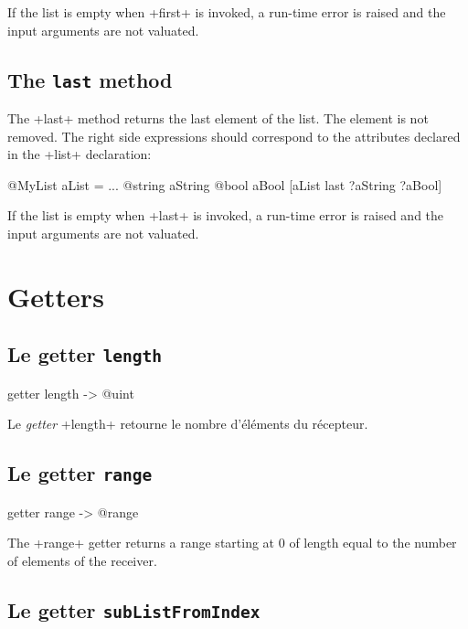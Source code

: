 If the list is empty when \ggs+first+ is invoked, a run-time error is raised and the input arguments are not valuated.

\subsection{The \texttt{last} method}

The \ggs+last+ method returns the last element of the list. The element is not removed. The right side expressions should correspond to the attributes declared in the \ggs+list+ declaration:\\

\begin{galgas}
@MyList aList = ...
@string aString
@bool aBool
[aList last ?aString ?aBool]
\end{galgas}


If the list is empty when \ggs+last+ is invoked, a run-time error is raised and the input arguments are not valuated.








\section{Getters}

\subsection{Le getter \texttt{length}}

\begin{galgas}
getter length -> @uint
\end{galgas}

Le \emph{getter} \ggs+length+ retourne le nombre d'éléments du récepteur.


\subsection{Le getter \texttt{range}}

\begin{galgas}
getter range -> @range
\end{galgas}

The \ggs+range+ getter returns a range starting at $0$ of length equal to the number of elements of the receiver.




\subsection{Le getter \texttt{subListFromIndex}}

